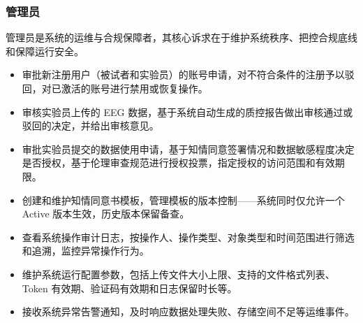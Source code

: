\subsubsection{管理员}

管理员是系统的运维与合规保障者，其核心诉求在于维护系统秩序、把控合规底线和保障运行安全。

\begin{itemize}
  \item 审批新注册用户（被试者和实验员）的账号申请，对不符合条件的注册予以驳回，对已激活的账号进行禁用或恢复操作。
  \item 审核实验员上传的 EEG 数据，基于系统自动生成的质控报告做出审核通过或驳回的决定，并给出审核意见。
  \item 审批实验员提交的数据使用申请，基于知情同意签署情况和数据敏感程度决定是否授权，基于伦理审查规范进行授权投票，指定授权的访问范围和有效期限。
  \item 创建和维护知情同意书模板，管理模板的版本控制——系统同时仅允许一个 Active 版本生效，历史版本保留备查。
  \item 查看系统操作审计日志，按操作人、操作类型、对象类型和时间范围进行筛选和追溯，监控异常操作行为。
  \item 维护系统运行配置参数，包括上传文件大小上限、支持的文件格式列表、Token 有效期、验证码有效期和日志保留时长等。
  \item 接收系统异常告警通知，及时响应数据处理失败、存储空间不足等运维事件。
\end{itemize}
